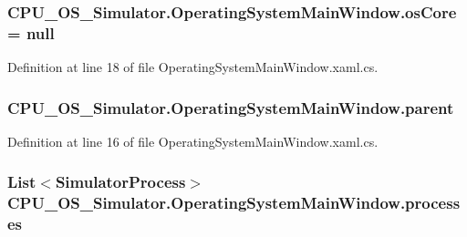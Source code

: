 \subsubsection[{os\+Core}]{ C\+P\+U\+\_\+\+O\+S\+\_\+\+Simulator.\+Operating\+System\+Main\+Window.\+os\+Core = {\bf null}\hspace{0.3cm}{\ttfamily [private]}}\label{class_c_p_u___o_s___simulator_1_1_operating_system_main_window_af944b743b4780850089320d08d38b0ed}


Definition at line 18 of file Operating\+System\+Main\+Window.\+xaml.\+cs.

\hypertarget{class_c_p_u___o_s___simulator_1_1_operating_system_main_window_a0219ba1583d00852bea36ac27c9d878d}{}
\subsubsection[{parent}]{ C\+P\+U\+\_\+\+O\+S\+\_\+\+Simulator.\+Operating\+System\+Main\+Window.\+parent\hspace{0.3cm}{\ttfamily [private]}}\label{class_c_p_u___o_s___simulator_1_1_operating_system_main_window_a0219ba1583d00852bea36ac27c9d878d}


Definition at line 16 of file Operating\+System\+Main\+Window.\+xaml.\+cs.

\hypertarget{class_c_p_u___o_s___simulator_1_1_operating_system_main_window_ab6bcbc8c33ec438d2f005d4c978e1a44}{}
\subsubsection[{processes}]{\setlength{\rightskip}{0pt plus 5cm}List$<${\bf Simulator\+Process}$>$ C\+P\+U\+\_\+\+O\+S\+\_\+\+Simulator.\+Operating\+System\+Main\+Window.\+processes\hspace{0.3cm}{\ttfamily [private]}}\label{class_c_p_u___o_s___simulator_1_1_operating_system_main_window_ab6bcbc8c33ec438d2f005d4c978e1a44}


